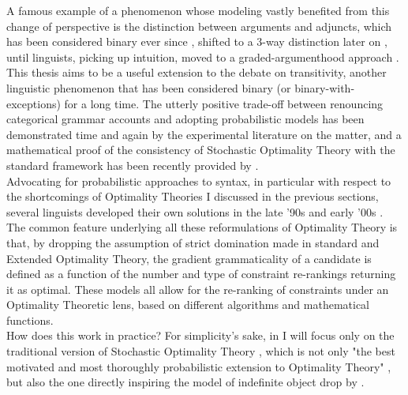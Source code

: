 A famous example of a phenomenon whose modeling vastly benefited from this change of perspective is the distinction between arguments and adjuncts, which has been considered binary ever since \textcite{tesniere2015elements}, shifted to a 3-way distinction later on \parencite{vanvalinlapolla1997syntax, Dowty2003, AldezabalEtAl2003, Villavicencio2002}, until linguists, picking up  intuition, moved to a graded-argumenthood approach \parencite{CennamoLenci2019, KimEtAl2019, KimEtAl2019a, KimEtAl2018}. This thesis aims to be a useful extension to the debate on transitivity, another linguistic phenomenon that has been considered binary (or binary-with-exceptions) for a long time.
The utterly positive trade-off between renouncing categorical grammar accounts and adopting probabilistic models has been demonstrated time and again by the experimental literature on the matter, and a mathematical proof of the consistency of Stochastic Optimality Theory with the standard framework has been recently provided by \textcite{magri2018implicational}. \\
Advocating for probabilistic approaches to syntax, in particular with respect to the shortcomings of Optimality Theories I discussed in the previous sections, several linguists developed their own solutions in the late '90s and early '00s \parencite{Boersma2004, SoraceKeller2005, Keller2000, Keller2006, AlexopoulouKeller2006, BoersmaHayes2001empirical, keller1998gradient, davidson2003tense}. The common feature underlying all these reformulations of Optimality Theory is that, by dropping the assumption of strict domination made in standard and Extended Optimality Theory, the gradient grammaticality of a candidate is defined as a function of the number and type of constraint re-rankings returning it as optimal. These models all allow for the re-ranking of constraints under an Optimality Theoretic lens, based on different algorithms and mathematical functions.\\
How does this work in practice? For simplicity's sake, in  I will focus only on the traditional version of Stochastic Optimality Theory \parencite{boersma1997we, BoersmaHayes2001empirical}, which is not only "the best motivated and most thoroughly probabilistic extension to Optimality Theory" \parencite[25]{manning2003probabilistic}, but also the one directly inspiring the model of indefinite object drop by \textcite{Medina2007}.


